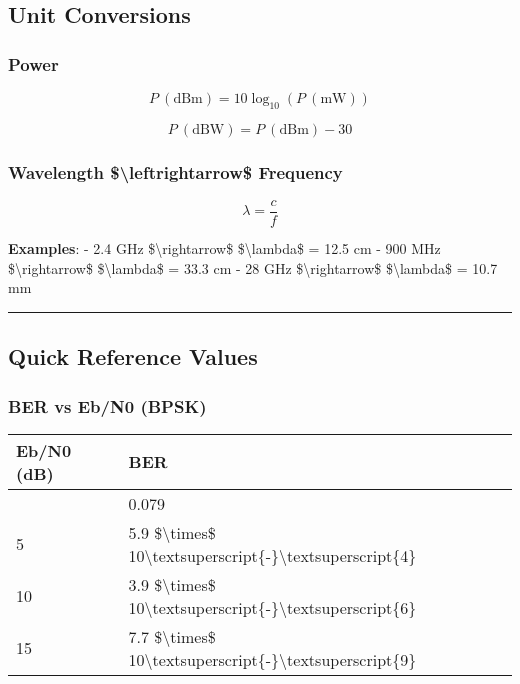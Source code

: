 \subsection{\texorpdfstring{ Unit
Conversions}{ Unit Conversions}}\label{unit-conversions}

\subsubsection{Power}\label{power}

\[
P\ (\text{dBm}) = 10\log_{10}(P\ (\text{mW}))
\]

\[
P\ (\text{dBW}) = P\ (\text{dBm}) - 30
\]

\subsubsection{Wavelength \$\textbackslash leftrightarrow\$
Frequency}\label{wavelength-frequency}

\[
\lambda = \frac{c}{f}
\]

\textbf{Examples}: - 2.4 GHz \$\textbackslash rightarrow\$
\$\textbackslash lambda\$ = 12.5 cm - 900 MHz
\$\textbackslash rightarrow\$ \$\textbackslash lambda\$ = 33.3 cm - 28
GHz \$\textbackslash rightarrow\$ \$\textbackslash lambda\$ = 10.7 mm

\begin{center}\rule{0.5\linewidth}{0.5pt}\end{center}

\subsection{\texorpdfstring{ Quick Reference
Values}{ Quick Reference Values}}\label{quick-reference-values}

\subsubsection{BER vs Eb/N0 (BPSK)}\label{ber-vs-ebn0-bpsk}

{\def\LTcaptype{} %
\begin{longtable}[]{@{}ll@{}}
\toprule\noalign{}
Eb/N0 (dB) & BER \\
\midrule\noalign{}
\endhead
\bottomrule\noalign{}
\endlastfoot
0 & 0.079 \\
5 & 5.9 \$\textbackslash times\$
10\textbackslash textsuperscript\{-\}\textbackslash textsuperscript\{4\} \\
10 & 3.9 \$\textbackslash times\$
10\textbackslash textsuperscript\{-\}\textbackslash textsuperscript\{6\} \\
15 & 7.7 \$\textbackslash times\$
10\textbackslash textsuperscript\{-\}\textbackslash textsuperscript\{9\} \\
\end{longtable}
}

